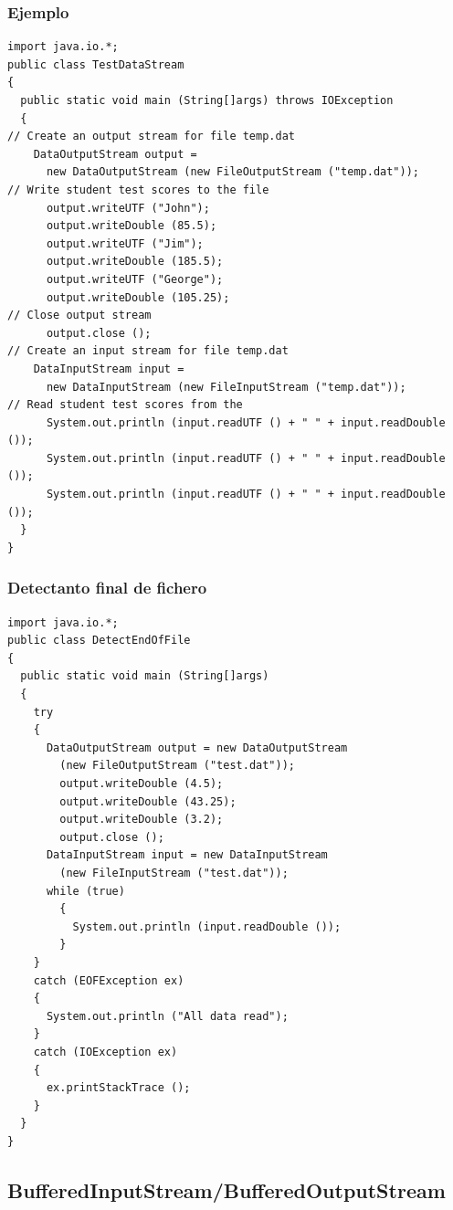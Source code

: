 \documentclass{beamer}
\begin{document}
\begin{frame}[fragile]
\frametitle{Ejemplo}
\begin{tiny}
\begin{verbatim}
import java.io.*;
public class TestDataStream
{
  public static void main (String[]args) throws IOException
  {
// Create an output stream for file temp.dat
    DataOutputStream output =
      new DataOutputStream (new FileOutputStream ("temp.dat"));
// Write student test scores to the file
      output.writeUTF ("John");
      output.writeDouble (85.5);
      output.writeUTF ("Jim");
      output.writeDouble (185.5);
      output.writeUTF ("George");
      output.writeDouble (105.25);
// Close output stream
      output.close ();
// Create an input stream for file temp.dat
    DataInputStream input =
      new DataInputStream (new FileInputStream ("temp.dat"));
// Read student test scores from the
      System.out.println (input.readUTF () + " " + input.readDouble ());
      System.out.println (input.readUTF () + " " + input.readDouble ());
      System.out.println (input.readUTF () + " " + input.readDouble ());
  }
}
\end{verbatim}
\end{tiny}
\end{frame}

\begin{frame}[fragile]
\frametitle{Detectanto final de fichero}
\begin{tiny}
\begin{verbatim}
import java.io.*;
public class DetectEndOfFile
{
  public static void main (String[]args)
  {
    try
    {
      DataOutputStream output = new DataOutputStream
        (new FileOutputStream ("test.dat"));
        output.writeDouble (4.5);
        output.writeDouble (43.25);
        output.writeDouble (3.2);
        output.close ();
      DataInputStream input = new DataInputStream
        (new FileInputStream ("test.dat"));
      while (true)
        {
          System.out.println (input.readDouble ());
        }
    }
    catch (EOFException ex)
    {
      System.out.println ("All data read");
    }
    catch (IOException ex)
    {
      ex.printStackTrace ();
    }
  }
}
\end{verbatim}
\end{tiny}
\end{frame}

\subsection{BufferedInputStream/BufferedOutputStream}
\end{document}
